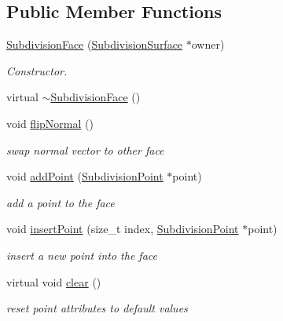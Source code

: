 \subsection*{Public Member Functions}
\begin{DoxyCompactItemize}
\item 
\hyperlink{classShipCAD_1_1SubdivisionFace_a082f81f7a5750f7e53ed5a92ddc82350}{Subdivision\-Face} (\hyperlink{classShipCAD_1_1SubdivisionSurface}{Subdivision\-Surface} $\ast$owner)
\begin{DoxyCompactList}\small\item\em Constructor. \end{DoxyCompactList}\item 
virtual \hyperlink{classShipCAD_1_1SubdivisionFace_a44a0acc598533bf6846e4f7272e5c191}{$\sim$\-Subdivision\-Face} ()
\item 
void \hyperlink{classShipCAD_1_1SubdivisionFace_a16d5e005d1c7c847ccf9ba72b67142fa}{flip\-Normal} ()
\begin{DoxyCompactList}\small\item\em swap normal vector to other face \end{DoxyCompactList}\item 
void \hyperlink{classShipCAD_1_1SubdivisionFace_a553df49a1137f89d2df2846ffca74842}{add\-Point} (\hyperlink{classShipCAD_1_1SubdivisionPoint}{Subdivision\-Point} $\ast$point)
\begin{DoxyCompactList}\small\item\em add a point to the face \end{DoxyCompactList}\item 
void \hyperlink{classShipCAD_1_1SubdivisionFace_aacd383eb085c4f6b92db89e25be6b3a1}{insert\-Point} (size\-\_\-t index, \hyperlink{classShipCAD_1_1SubdivisionPoint}{Subdivision\-Point} $\ast$point)
\begin{DoxyCompactList}\small\item\em insert a new point into the face \end{DoxyCompactList}\item 
virtual void \hyperlink{classShipCAD_1_1SubdivisionFace_a413ae7e76f559780c8a69e998974fb75}{clear} ()
\begin{DoxyCompactList}\small\item\em reset point attributes to default values \end{DoxyCompactList}\item 

\end{DoxyCompactItemize}
